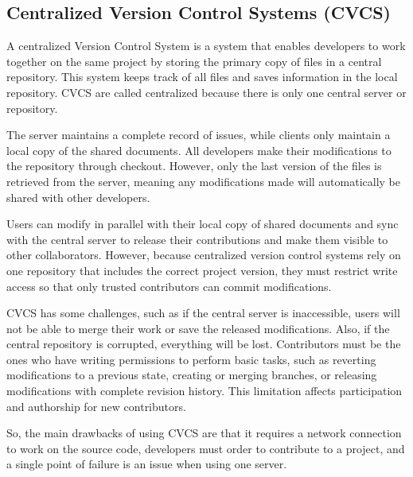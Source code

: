 \subsection{Centralized Version Control Systems (CVCS)}
A centralized Version Control System is a system that enables developers to work together on the same project by storing the primary copy of files in a central repository. This system keeps track of all files and saves information in the local repository. CVCS are called centralized because there is only one central server or repository.

The server maintains a complete record of issues, while clients only maintain a local copy of the shared documents. All developers make their modifications to the repository through checkout. However, only the last version of the files is retrieved from the server, meaning any modifications made will automatically be shared with other developers.

Users can modify in parallel with their local copy of shared documents and sync with the central server to release their contributions and make them visible to other collaborators. However, because centralized version control systems rely on one repository that includes the correct project version, they must restrict write access so that only trusted contributors can commit modifications.

CVCS has some challenges, such as if the central server is inaccessible, users will not be able to merge their work or save the released modifications. Also, if the central repository is corrupted, everything will be lost. Contributors must be the ones who have writing permissions to perform basic tasks, such as reverting modifications to a previous state, creating or merging branches, or releasing modifications with complete revision history. This limitation affects participation and authorship for new contributors.

So, the main drawbacks of using CVCS are that it requires a network connection to work on the source code, developers must order to contribute to a project, and a single point of failure is an issue when using one server.

